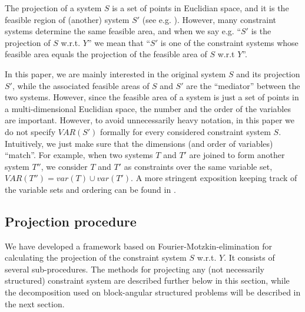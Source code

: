 The projection of a system $S$ is a set of points in Euclidian space, and it is the feasible region of (another) system $S'$ (see e.g. \cite{ziegler95}). However, many constraint systems determine the same feasible area, and when we say e.g. ``$S'$ is the projection of $S$ w.r.t. $Y$'' we mean that ``$S'$ is one of the constraint systems whose feasible area equals the projection of the feasible area of $S$ w.r.t $Y$''.

In this paper, we are mainly interested in the original system $S$ and its projection $S'$, while the associated feasible areas of $S$ and $S'$ are the ``mediator'' between the two systems. 
However, since the feasible area of a system is just a set of points in a multi-dimensional Euclidian space, the number and the order of the variables are important. However, to avoid unnecessarily heavy notation, in this paper we do not specify $VAR(S')$ formally for every considered constraint system $S$.
Intuitively, we just make sure that the dimensions (and order of variables) ``match''. For example, when two systems $T$ and $T'$ are joined to form another system $T''$, we consider $T$ and $T'$ as constraints over the same variable set, $VAR(T'')=var(T)\cup var(T')$.
A more stringent exposition keeping track of the variable sets and ordering can be found in \cite{MyTechRep}.

\subsection{Projection procedure}\label{sec:methods}
We have developed a framework based on Fourier-Motzkin-elimination for calculating the projection of the constraint system $S$ w.r.t. $Y$. It 
consists of several sub-procedures. The methods for projecting any (not necessarily structured) constraint system are described further below in this section, while the decomposition used on block-angular structured problems will be described in the next section.

